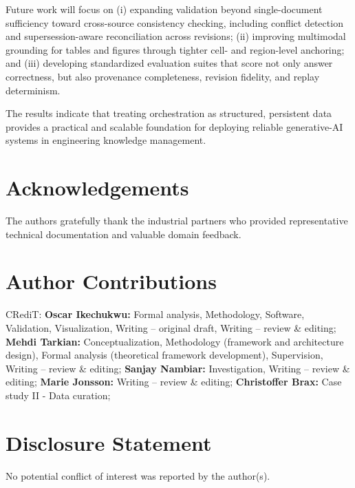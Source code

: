 \documentclass[largeformat]{interact}
\begin{document}
Future work will focus on (i) expanding validation beyond single-document sufficiency toward cross-source consistency checking, including conflict detection and supersession-aware reconciliation across revisions; (ii) improving multimodal grounding for tables and figures through tighter cell- and region-level anchoring; and (iii) developing standardized evaluation suites that score not only answer correctness, but also provenance completeness, revision fidelity, and replay determinism.

The results indicate that treating orchestration as structured, persistent data provides a practical and scalable foundation for deploying reliable generative-AI systems in engineering knowledge management.


\section*{Acknowledgements}
The authors gratefully thank the industrial partners who provided representative technical documentation and valuable domain feedback.

\section*{Author Contributions}
CRediT: \textbf{Oscar Ikechukwu:} Formal analysis, Methodology, Software, Validation, Visualization, Writing -- original draft, Writing -- review \& editing; \textbf{Mehdi Tarkian:} Conceptualization, Methodology (framework and architecture design), Formal analysis (theoretical framework development), Supervision, Writing -- review \& editing; \textbf{Sanjay Nambiar:} Investigation, Writing -- review \& editing; \textbf{Marie Jonsson:} Writing -- review \& editing; \textbf{Christoffer Brax:} Case study II - Data curation;

\section*{Disclosure Statement}
No potential conflict of interest was reported by the author(s).
\end{document}

